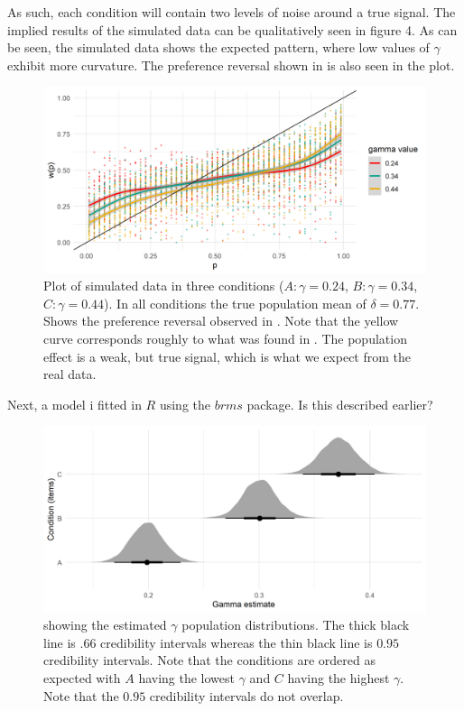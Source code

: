 \documentclass[12pt]{article}
\begin{document}
As such, each condition will contain
two levels of noise around a true signal.
The implied results of the simulated data
can be qualitatively seen in figure 4.
As can be seen, the simulated data shows
the expected pattern, where low values of
$\gamma$ exhibit more curvature. The preference
reversal shown in \textcite{rottenstreich2001money}
is also seen in the plot.

\begin{figure}[h!]
	\includegraphics[width = \linewidth]
	{../Figures/simulated.png}
	\caption{Plot of simulated data in three
		conditions ($A: \gamma = 0.24$,
		$B: \gamma = 0.34$,
		$C: \gamma = 0.44$). In all conditions
		the true population mean of
		$\delta = 0.77$. Shows the preference
		reversal observed in
	\textcite{rottenstreich2001money}. Note
	that the yellow curve corresponds
	roughly to what was found in
	\textcite{gonzalez1999shape}.
	The population effect is a
	weak, but true signal, which is
what we expect from the real data.}
	\end{figure}

Next, a model i fitted in $R$ using the
 $brms$ package. Is this described earlier?

\begin{figure}[h!]
	\includegraphics[width = \linewidth]
	{../Figures/gamma.png}
	\caption{showing the estimated  $\gamma$
	population distributions. The thick
	black line is  $.66$ credibility intervals
	whereas the thin black line is  $0.95$
	credibility intervals. Note that the
	conditions are ordered as expected with
	 $A$ having the lowest  $\gamma$ and
	 $C$ having the highest  $\gamma$.
	 Note that the  $0.95$ credibility
	 intervals do not overlap.}
 \end{figure}
\end{document}
